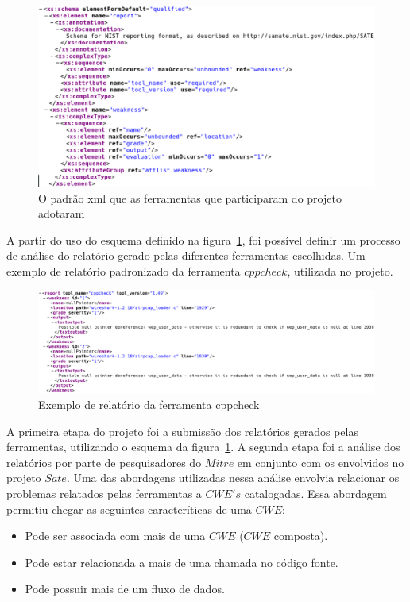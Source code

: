 \newpage
\begin{figure}[h]
	\centering
	\label{sate_schema}
        \includegraphics[scale=0.42]{figuras/sate_schema.eps}
	\caption{O padrão xml que as ferramentas que participaram do projeto adotaram}
\end{figure}

A partir do uso do esquema definido na figura~\ref{sate_schema}, foi possível definir um processo de análise do relatório
gerado pelas diferentes ferramentas escolhidas. Um exemplo de relatório padronizado da ferramenta $cppcheck$, utilizada no projeto.

\begin{figure}[h]
	\centering
	\label{cppcheck}
        \includegraphics[scale=0.42]{figuras/cppcheck.eps}
	\caption{Exemplo de relatório da ferramenta cppcheck}
\end{figure}
\newpage

A primeira etapa do projeto foi a submissão dos relatórios gerados pelas ferramentas, utilizando o esquema da figura~\ref{sate_schema}. A segunda etapa foi a análise dos relatórios por parte de pesquisadores do $Mitre$ em conjunto com os envolvidos no projeto $Sate$. Uma das abordagens utilizadas nessa análise envolvia relacionar os problemas relatados pelas ferramentas a $CWE's$ catalogadas. Essa abordagem permitiu chegar as seguintes caracteríticas de uma $CWE$:

\begin{itemize}
        \item Pode ser associada com mais de uma $CWE$ ($CWE$ composta).
        \item Pode estar relacionada a mais de uma chamada no código fonte.
        \item Pode possuir mais de um fluxo de dados.
\end{itemize}

